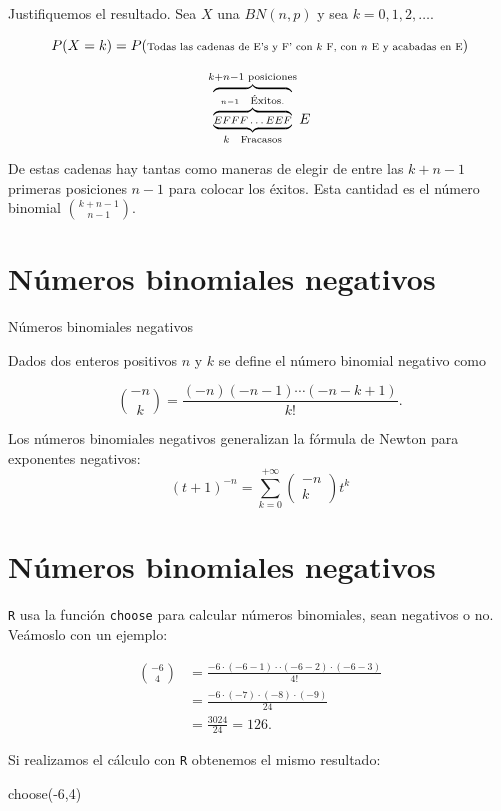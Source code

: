 \documentclass[
  letterpaper,
  DIV=11,
  numbers=noendperiod]{scrreprt}
\newenvironment{Shaded}{\begin{snugshade}}{\end{snugshade}}
\newcommand{\DecValTok}[1]{\textcolor[rgb]{0.68,0.00,0.00}{#1}}
\newcommand{\FunctionTok}[1]{\textcolor[rgb]{0.28,0.35,0.67}{#1}}
\newcommand{\NormalTok}[1]{\textcolor[rgb]{0.00,0.23,0.31}{#1}}
\newcommand{\SpecialCharTok}[1]{\textcolor[rgb]{0.37,0.37,0.37}{#1}}
\begin{document}
Justifiquemos el resultado. Sea \(X\) una \(BN(n,p)\) y sea
\(k=0,1,2,\ldots\).

\[\scriptsize{P(X=k)=P(\mbox{Todas las cadenas de E's y F' con $k$ F, con $n$ E y acabadas en E})}\]

\[
\scriptsize{\overbrace{\underbrace{\overbrace{EFFF\ldots EEF}^{n-1 \quad \mbox{Éxitos}.}}}_{k \quad\mbox{Fracasos}}^{k+n-1\mbox{ posiciones}}E}
\]

De estas cadenas hay tantas como maneras de elegir de entre las
\(k+n-1\) primeras posiciones \(n-1\) para colocar los éxitos. Esta
cantidad es el número binomial \({k+n-1\choose n-1}.\)

\section{Números binomiales
negativos}\label{nuxfameros-binomiales-negativos}

Números binomiales negativos

Dados dos enteros positivos \(n\) y \(k\) se define el número binomial
negativo como

\[\binom{-n}{k}=\frac{(-n)(-n-1)\cdots (-n-k+1)}{k!}.\]

Los números binomiales negativos generalizan la fórmula de Newton para
exponentes negativos: \[
(t+1)^{-n}=\sum_{k=0}^{+\infty}\left(\begin{array}{c} -n
\\ k\end{array}\right) t^{k}
\]

\section{Números binomiales
negativos}\label{nuxfameros-binomiales-negativos-1}

\texttt{R} usa la función \texttt{choose} para calcular números
binomiales, sean negativos o no. Veámoslo con un ejemplo:

\[
\begin{array}{rl}
{-6\choose 4}&=\frac{-6\cdot (-6-1)\cdot \cdot (-6-2)\cdot (-6-3) }{4!}\\
&=  \frac{-6\cdot(-7)\cdot (-8)\cdot (-9)}{24}\\
&= \frac{3024}{24}=126.
\end{array}
\]

Si realizamos el cálculo con \texttt{R} obtenemos el mismo resultado:

\begin{Shaded}
\begin{Highlighting}[]
\FunctionTok{choose}\NormalTok{(}\SpecialCharTok{{-}}\DecValTok{6}\NormalTok{,}\DecValTok{4}\NormalTok{)}
\end{Highlighting}
\end{Shaded}
\end{document}
